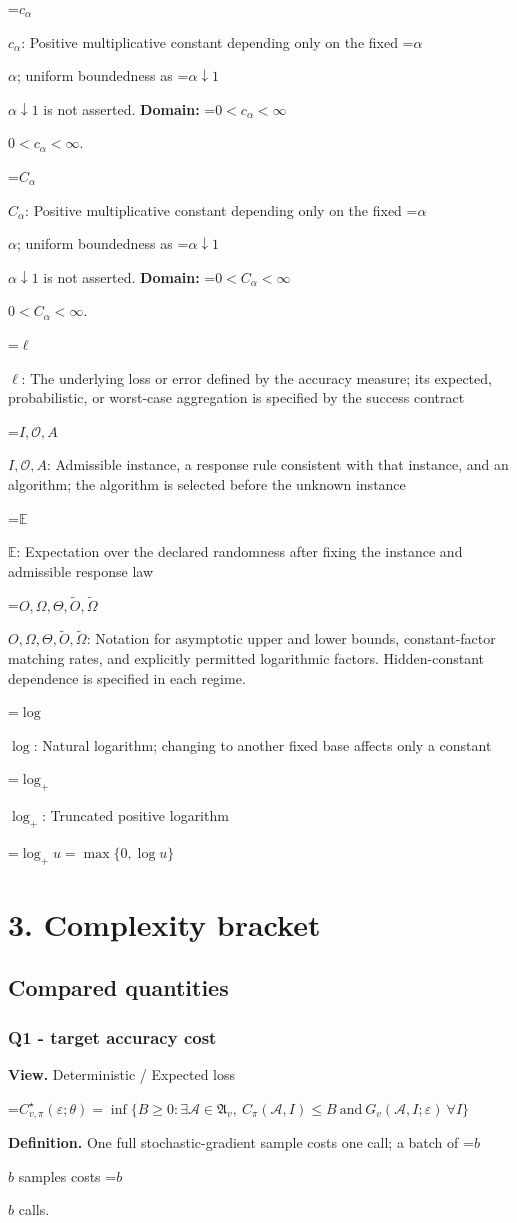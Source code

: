 \documentclass[10pt,a4paper]{article}
\newcommand{\AtlasMath}[1]{\par\begingroup\centering\setbox0=\hbox{$\displaystyle #1$}\ifdim\wd0>1.4\linewidth\typeout{ATLAS WIDE FORMULA: \the\wd0}\fi\ifdim\wd0>\linewidth\resizebox{\linewidth}{!}{\box0}\else\box0\fi\par\endgroup}
\newcommand{\AtlasInlineMath}[1]{\begingroup\setbox0=\hbox{$#1$}\ifdim\wd0>.4\linewidth\endgroup\AtlasMath{#1}\else\endgroup$#1$\fi}
\begin{document}
\AtlasInlineMath{c_\alpha}: Positive multiplicative constant depending only on the fixed \AtlasInlineMath{\alpha}; uniform boundedness as \AtlasInlineMath{\alpha\downarrow1} is not asserted. \textbf{Domain:} \AtlasInlineMath{0<c_\alpha<\infty}.

\AtlasInlineMath{C_\alpha}: Positive multiplicative constant depending only on the fixed \AtlasInlineMath{\alpha}; uniform boundedness as \AtlasInlineMath{\alpha\downarrow1} is not asserted. \textbf{Domain:} \AtlasInlineMath{0<C_\alpha<\infty}.

\AtlasInlineMath{\ell}: The underlying loss or error defined by the accuracy measure; its expected, probabilistic, or worst-case aggregation is specified by the success contract

\AtlasInlineMath{I,\mathcal{O},A}: Admissible instance, a response rule consistent with that instance, and an algorithm; the algorithm is selected before the unknown instance

\AtlasInlineMath{\mathbb{E}}: Expectation over the declared randomness after fixing the instance and admissible response law

\AtlasInlineMath{O,\Omega,\Theta,\widetilde{O},\widetilde\Omega}: Notation for asymptotic upper and lower bounds, constant-factor matching rates, and explicitly permitted logarithmic factors. Hidden-constant dependence is specified in each regime.

\AtlasInlineMath{\log}: Natural logarithm; changing to another fixed base affects only a constant

\AtlasInlineMath{\log_+}: Truncated positive logarithm


\AtlasMath{\log_+u=\max\{0,\log u\}}


\section{3. Complexity bracket}
\subsection{Compared quantities}
\subsubsection{Q1 - target accuracy cost}
\textbf{View.} Deterministic / Expected loss

\AtlasMath{C^\star_{v,\pi}(\varepsilon;\theta)=\inf\{B\ge0:\exists\mathcal A\in\mathfrak A_v,\ C_\pi(\mathcal A,I)\le B\ \text{and}\ G_v(\mathcal A,I;\varepsilon)\ \forall I\}}
\textbf{Definition.} One full stochastic-gradient sample costs one call; a batch of \AtlasInlineMath{b} samples costs \AtlasInlineMath{b} calls.
\end{document}
